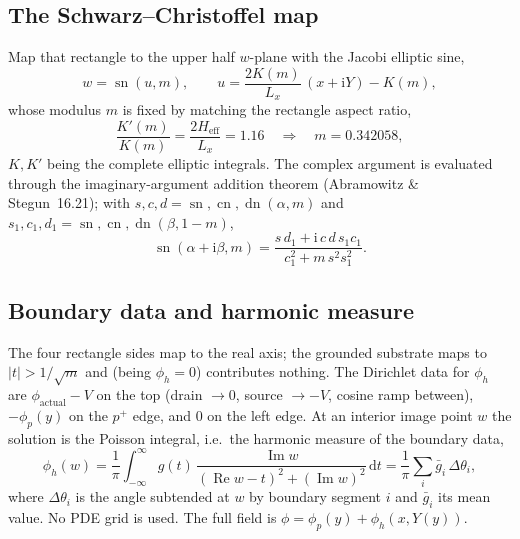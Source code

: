 \documentclass[11pt]{article}
\newcommand{\Heff}{H_{\mathrm{eff}}}
\newcommand{\Lx}{L_{x}}
\newcommand{\phih}{\phi_{h}}
\newcommand{\phip}{\phi_{p}}
\newcommand{\dd}{\mathrm{d}}
\newcommand{\ii}{\mathrm{i}}
\begin{document}
\subsection{The Schwarz--Christoffel map}
Map that rectangle to the upper half $w$-plane with the Jacobi elliptic sine,
\begin{equation}
w=\operatorname{sn}(u,m),
\qquad
u=\frac{2K(m)}{\Lx}\,(x+\ii Y)-K(m),
\label{eq:map}
\end{equation}
whose modulus $m$ is fixed by matching the rectangle aspect ratio,
\begin{equation}
\frac{K'(m)}{K(m)}=\frac{2\Heff}{\Lx}=1.16
\quad\Longrightarrow\quad m=0.342058,
\label{eq:modulus}
\end{equation}
$K,K'$ being the complete elliptic integrals. The complex argument is evaluated
through the imaginary-argument addition theorem (Abramowitz \& Stegun~16.21); with
$s,c,d=\operatorname{sn},\operatorname{cn},\operatorname{dn}(\alpha,m)$ and
$s_{1},c_{1},d_{1}=\operatorname{sn},\operatorname{cn},\operatorname{dn}(\beta,1{-}m)$,
\begin{equation}
\operatorname{sn}(\alpha+\ii\beta,m)=
\frac{s\,d_{1}+\ii\,c\,d\,s_{1}c_{1}}{c_{1}^{2}+m\,s^{2}s_{1}^{2}}.
\label{eq:snadd}
\end{equation}

\subsection{Boundary data and harmonic measure}
The four rectangle sides map to the real axis; the grounded substrate maps to
$|t|>1/\sqrt{m}$ and (being $\phih=0$) contributes nothing. The Dirichlet data for
$\phih$ are $\phi_{\text{actual}}-V$ on the top (drain $\to 0$, source $\to -V$,
cosine ramp between), $-\phip(y)$ on the $p^{+}$ edge, and $0$ on the left edge.
At an interior image point $w$ the solution is the Poisson integral, i.e.\ the
harmonic measure of the boundary data,
\begin{equation}
\phih(w)=\frac{1}{\pi}\int_{-\infty}^{\infty}
 g(t)\,\frac{\operatorname{Im}w}{(\operatorname{Re}w-t)^{2}+(\operatorname{Im}w)^{2}}\,\dd t
 =\frac{1}{\pi}\sum_{i} \bar g_{i}\,\Delta\theta_{i},
\label{eq:poissonkernel}
\end{equation}
where $\Delta\theta_{i}$ is the angle subtended at $w$ by boundary segment $i$ and
$\bar g_i$ its mean value. No PDE grid is used. The full field is
$\phi=\phip(y)+\phih(x,Y(y))$.
\end{document}
